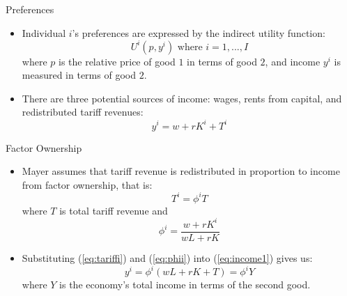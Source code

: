 \documentclass[aspectratio=169]{beamer}
\begin{document}

\begin{frame}{Preferences}

\begin{itemize}
    \item<1-> Individual $ i $'s preferences are expressed by the indirect utility function:
    \begin{equation}
        U^{i}\left( p, y^{i} \right) \text{ where } i = 1,...,I
        \label{eq:utility1}
    \end{equation}
    where $ p $ is the relative price of good $ 1 $ in terms of good $ 2 $, and income $ y^{i} $ is measured in terms of good $ 2 $.
    \item<2-> There are three potential sources of income: wages, rents from capital, and redistributed tariff revenues:
    \begin{equation}
        y^{i} = w + rK^{i} + T^{i}
        \label{eq:income1}
    \end{equation}
\end{itemize}
    
\end{frame}


\begin{frame}{Factor Ownership}

\begin{itemize}
    \item<1-> Mayer assumes that tariff revenue is redistributed in proportion to income from factor ownership, that is:
    \begin{equation}
        T^{i} = \phi^{i} T
        \label{eq:tariffi}
    \end{equation}
    where $ T $ is total tariff revenue and
    \begin{equation}
        \phi^{i} = \frac{w + rK^{i}}{wL + rK}
        \label{eq:phii}
    \end{equation}
    \item<2-> Substituting (\ref{eq:tariffi}) and (\ref{eq:phii}) into (\ref{eq:income1}) gives us:
    \begin{equation}
        y^{i} = \phi^{i}\left( wL + rK + T \right) = \phi^{i} Y
        \label{eq:income2}
    \end{equation}
    where $ Y $ is the economy's total income in terms of the second good.
\end{itemize}
    
\end{frame}
\end{document}
